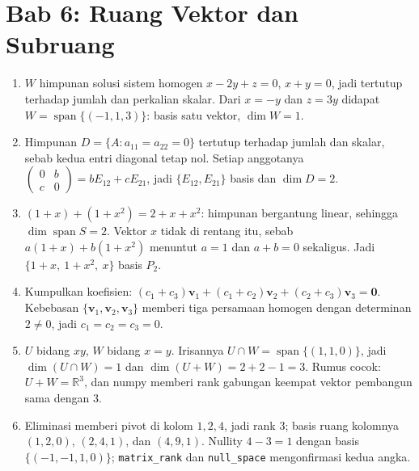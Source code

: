 
\section*{Bab 6: Ruang Vektor dan Subruang}
\begin{enumerate}[label=\textbf{6.\arabic*}]
  \item $W$ himpunan solusi sistem homogen $x-2y+z=0$, $x+y=0$, jadi tertutup
        terhadap jumlah dan perkalian skalar. Dari $x=-y$ dan $z=3y$ didapat
        $W=\operatorname{span}\{(-1,1,3)\}$: basis satu vektor, $\dim W=1$.

  \item Himpunan $D=\{A:a_{11}=a_{22}=0\}$ tertutup terhadap jumlah dan skalar,
        sebab kedua entri diagonal tetap nol. Setiap anggotanya
        $\begin{pmatrix}0&b\\c&0\end{pmatrix}=bE_{12}+cE_{21}$, jadi
        $\{E_{12},E_{21}\}$ basis dan $\dim D=2$.

  \item $(1+x)+(1+x^{2})=2+x+x^{2}$: himpunan bergantung linear, sehingga
        $\dim\operatorname{span}S=2$. Vektor $x$ tidak di rentang itu, sebab
        $a(1+x)+b(1+x^{2})$ menuntut $a=1$ dan $a+b=0$ sekaligus. Jadi
        $\{1+x,\ 1+x^{2},\ x\}$ basis $P_{2}$.

  \item Kumpulkan koefisien: $(c_{1}+c_{3})\mathbf{v}_{1}+(c_{1}+c_{2})
        \mathbf{v}_{2}+(c_{2}+c_{3})\mathbf{v}_{3}=\mathbf{0}$. Kebebasan
        $\{\mathbf{v}_{1},\mathbf{v}_{2},\mathbf{v}_{3}\}$ memberi tiga persamaan
        homogen dengan determinan $2\ne0$, jadi $c_{1}=c_{2}=c_{3}=0$.

  \item $U$ bidang $xy$, $W$ bidang $x=y$. Irisannya
        $U\cap W=\operatorname{span}\{(1,1,0)\}$, jadi $\dim(U\cap W)=1$ dan
        $\dim(U+W)=2+2-1=3$. Rumus cocok: $U+W=\mathbb{R}^{3}$, dan numpy
        memberi rank gabungan keempat vektor pembangun sama dengan $3$.

  \item Eliminasi memberi pivot di kolom $1,2,4$, jadi rank $3$; basis ruang
        kolomnya $(1,2,0)$, $(2,4,1)$, dan $(4,9,1)$. Nullity $4-3=1$ dengan
        basis $\{(-1,-1,1,0)\}$; \texttt{matrix\_rank} dan
        \texttt{null\_space} mengonfirmasi kedua angka.


\end{enumerate}
